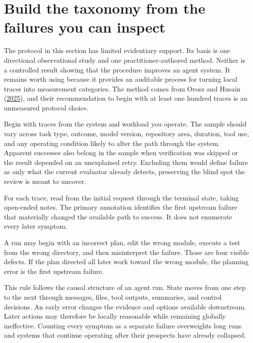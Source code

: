 \hypertarget{build-the-taxonomy-from-the-failures-you-can-inspect}{%
\section{Build the taxonomy from the failures you can inspect}\label{build-the-taxonomy-from-the-failures-you-can-inspect}}

The protocol in this section has limited evidentiary support. Its basis is one directional observational study and one practitioner-authored method. Neither is a controlled result showing that the procedure improves an agent system. It remains worth using because it provides an auditable process for turning local traces into measurement categories. The method comes from Orosz and Husain (\href{https://newsletter.pragmaticengineer.com/p/evals}{2025}), and their recommendation to begin with at least one hundred traces is an unmeasured protocol choice.

Begin with traces from the system and workload you operate. The sample should vary across task type, outcome, model version, repository area, duration, tool use, and any operating condition likely to alter the path through the system. Apparent successes also belong in the sample when verification was skipped or the result depended on an unexplained retry. Excluding them would define failure as only what the current evaluator already detects, preserving the blind spot the review is meant to uncover.

For each trace, read from the initial request through the terminal state, taking open-ended notes. The primary annotation identifies the first upstream failure that materially changed the available path to success. It does not enumerate every later symptom.

A run may begin with an incorrect plan, edit the wrong module, execute a test from the wrong directory, and then misinterpret the failure. Those are four visible defects. If the plan directed all later work toward the wrong module, the planning error is the first upstream failure.

This rule follows the causal structure of an agent run. State moves from one step to the next through messages, files, tool outputs, summaries, and control decisions. An early error changes the evidence and options available downstream. Later actions may therefore be locally reasonable while remaining globally ineffective. Counting every symptom as a separate failure overweights long runs and systems that continue operating after their prospects have already collapsed.

